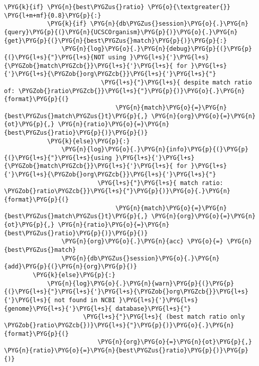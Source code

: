\begin{Verbatim}[commandchars=\\\{\}]
        \PYG{k}{if} \PYG{n}{best\PYGZus{}ratio} \PYG{o}{\textgreater{}} \PYG{l+m+mf}{0.8}\PYG{p}{:}
            \PYG{k}{if} \PYG{n}{db\PYGZus{}session}\PYG{o}{.}\PYG{n}{query}\PYG{p}{(}\PYG{n}{UCSCOrganism}\PYG{p}{)}\PYG{o}{.}\PYG{n}{get}\PYG{p}{(}\PYG{n}{best\PYGZus{}match}\PYG{p}{)}\PYG{p}{:}
                \PYG{n}{log}\PYG{o}{.}\PYG{n}{debug}\PYG{p}{(}\PYG{p}{(}\PYG{l+s}{"}\PYG{l+s}{NOT using }\PYG{l+s}{'}\PYG{l+s}{\PYGZob{}match\PYGZcb{}}\PYG{l+s}{'}\PYG{l+s}{ for }\PYG{l+s}{'}\PYG{l+s}{\PYGZob{}org\PYGZcb{}}\PYG{l+s}{'}\PYG{l+s}{"}
                           \PYG{l+s}{"}\PYG{l+s}{ despite match ratio of: \PYGZob{}ratio\PYGZcb{}}\PYG{l+s}{"}\PYG{p}{)}\PYG{o}{.}\PYG{n}{format}\PYG{p}{(}
                               \PYG{n}{match}\PYG{o}{=}\PYG{n}{best\PYGZus{}match\PYGZus{}t}\PYG{p}{,} \PYG{n}{org}\PYG{o}{=}\PYG{n}{ot}\PYG{p}{,} \PYG{n}{ratio}\PYG{o}{=}\PYG{n}{best\PYGZus{}ratio}\PYG{p}{)}\PYG{p}{)}
            \PYG{k}{else}\PYG{p}{:}
                \PYG{n}{log}\PYG{o}{.}\PYG{n}{info}\PYG{p}{(}\PYG{p}{(}\PYG{l+s}{"}\PYG{l+s}{using }\PYG{l+s}{'}\PYG{l+s}{\PYGZob{}match\PYGZcb{}}\PYG{l+s}{'}\PYG{l+s}{ for }\PYG{l+s}{'}\PYG{l+s}{\PYGZob{}org\PYGZcb{}}\PYG{l+s}{'}\PYG{l+s}{"}
                          \PYG{l+s}{"}\PYG{l+s}{ match ratio: \PYGZob{}ratio\PYGZcb{}}\PYG{l+s}{"}\PYG{p}{)}\PYG{o}{.}\PYG{n}{format}\PYG{p}{(}
                               \PYG{n}{match}\PYG{o}{=}\PYG{n}{best\PYGZus{}match\PYGZus{}t}\PYG{p}{,} \PYG{n}{org}\PYG{o}{=}\PYG{n}{ot}\PYG{p}{,} \PYG{n}{ratio}\PYG{o}{=}\PYG{n}{best\PYGZus{}ratio}\PYG{p}{)}\PYG{p}{)}
                \PYG{n}{org}\PYG{o}{.}\PYG{n}{acc} \PYG{o}{=} \PYG{n}{best\PYGZus{}match}
                \PYG{n}{db\PYGZus{}session}\PYG{o}{.}\PYG{n}{add}\PYG{p}{(}\PYG{n}{org}\PYG{p}{)}
        \PYG{k}{else}\PYG{p}{:}
            \PYG{n}{log}\PYG{o}{.}\PYG{n}{warn}\PYG{p}{(}\PYG{p}{(}\PYG{l+s}{"}\PYG{l+s}{'}\PYG{l+s}{\PYGZob{}org\PYGZcb{}}\PYG{l+s}{'}\PYG{l+s}{ not found in NCBI }\PYG{l+s}{'}\PYG{l+s}{genome}\PYG{l+s}{'}\PYG{l+s}{ database}\PYG{l+s}{"}
                      \PYG{l+s}{"}\PYG{l+s}{ (best match ratio only \PYGZob{}ratio\PYGZcb{})}\PYG{l+s}{"}\PYG{p}{)}\PYG{o}{.}\PYG{n}{format}\PYG{p}{(}
                          \PYG{n}{org}\PYG{o}{=}\PYG{n}{ot}\PYG{p}{,} \PYG{n}{ratio}\PYG{o}{=}\PYG{n}{best\PYGZus{}ratio}\PYG{p}{)}\PYG{p}{)}


\end{Verbatim}
